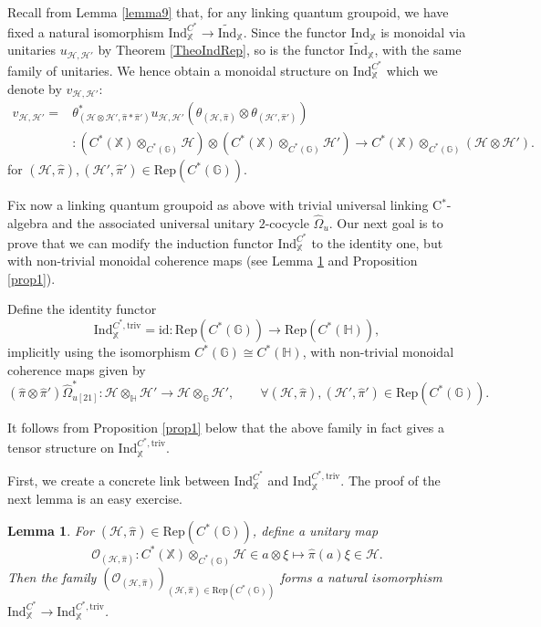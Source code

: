 \documentclass[reqno]{amsart}
\numberwithin{equation}{section}
\newtheorem{Lem}[Theorem]{Lemma}
\newcommand{\id}{\mathrm{id}}
\newcommand{\Hsp}{\mathcal{H}}
\newcommand{\G}{\mathbb{G}}
\newcommand{\Hh}{\mathbb{H}}
\newcommand{\X}{\mathbb{X}}
\newcommand{\Rep}{\mathrm{Rep}}
\newcommand{\Ind}{\mathrm{Ind}}
\newcommand{\triv}{\mathrm{triv}}
\newcommand{\mc}{\mathcal}
\newcommand{\HH}{\mathbb{H}}
\newcommand{\GG}{\mathbb{G}}
\begin{document}
Recall from Lemma \ref{lemma9} that, for any linking quantum groupoid, we have fixed a natural isomorphism $\Ind_{\X}^{C^*}\rightarrow \widetilde{\Ind}_{\X}$. Since the functor $\Ind_{\X}$ is monoidal via unitaries $u_{\mc{H},\mc{H}'}$ by Theorem \ref{TheoIndRep}, so is the functor $\widetilde{\Ind}_{\X}$, with the same family of unitaries. We hence obtain a monoidal structure on $\Ind_{\X}^{C^*}$ which we denote by $v_{\mc{H},\mc{H}'}$:
\begin{equation}\label{eq36}\begin{split}
v_{\mc{H},\mc{H}'}=&\theta_{(\mc{H}\otimes\mc{H}',\hat{\pi}\ast\hat{\pi}')}^*
u_{\mc{H},\mc{H}'}
(\theta_{(\mc{H},\hat{\pi})}\otimes 
\theta_{(\mc{H}',\hat{\pi}')})\\
&\colon 
(C^*(\X)\otimes_{C^*(\GG)}\mc{H} )\otimes 
(C^*(\X)\otimes_{C^*(\GG)}\mc{H}' )
\rightarrow
C^*(\X)\otimes_{C^*(\GG)}(\mc{H}\otimes\mc{H}').
\end{split}
\end{equation}
for $(\mc{H},\hat{\pi}),(\mc{H}',\hat{\pi}')\in \Rep(C^*(\GG))$.

Fix now a linking quantum groupoid as above with trivial universal linking  C$^*$-algebra and the associated universal unitary $2$-cocycle $\hat{\Omega}_u$. Our next goal is to prove that we can modify the induction functor $\Ind_{\X}^{C^*}$ to the identity one, but with non-trivial monoidal coherence maps (see Lemma \ref{lemma10} and Proposition \ref{prop1}). 

Define the identity functor 
\[
\Ind_{\X}^{C^*,\triv} = \id\colon \Rep(C^*(\G)) \rightarrow \Rep(C^*(\Hh)),
\]
implicitly using the isomorphism $C^*(\GG)\cong C^*(\HH)$, with non-trivial monoidal coherence maps given by 
\begin{equation}\label{EqMonoidalCoherence}
(\hat{\pi}\otimes \hat{\pi}')\hat{\Omega}_{u [21]}^*\colon \Hsp\otimes_{\Hh}\Hsp'\rightarrow \Hsp\otimes_{\G}\Hsp',\quad\quad\forall (\mc{H},\hat{\pi}),(\mc{H}',\hat{\pi}')\in \Rep(C^*(\GG)).
\end{equation}

It follows from Proposition \ref{prop1} below that the above family in fact gives a tensor structure on $\Ind^{C^*,\triv}_{\X}$. 

First, we create a concrete link between $\Ind_{\X}^{C^*}$ and  $\Ind_{\X}^{C^*,\triv}$. The proof of the next lemma is an easy exercise.

\begin{Lem}\label{lemma10}
For $(\mc{H},\hat{\pi})\in \Rep(C^*(\G))$, define a unitary map
\[
\mc{O}_{(\mc{H},\hat{\pi})}\colon C^*(\X)\otimes_{C^*(\G)}\mc{H}\in a\otimes\xi\mapsto \hat{\pi}(a)\xi \in\mc{H}.
\]
Then the family $(\mc{O}_{(\mc{H},\hat{\pi})})_{(\mc{H},\hat{\pi})\in \Rep(C^*(\G))}$ forms a natural isomorphism $\Ind_{\X}^{C^*}\rightarrow \Ind_{\X}^{C^*,\triv}$.
\end{Lem}
\end{document}
